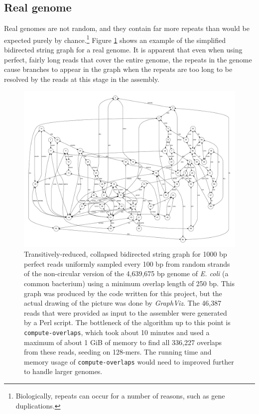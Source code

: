 \documentclass[10pt]{article}
\newcommand{\Figure}[1]{Figure \ref{#1}}
\newcommand{\ProgramName}[1]{{\tt #1}}
\begin{document}
\subsection{Real genome}

Real genomes are not random, and they contain far more repeats than would be
expected purely by chance.\footnote{Biologically, repeats can occur for a number
of reasons, such as gene duplications.} \Figure{fig:E_coli} shows an example of
the simplified bidirected string graph for a real genome.  It is apparent that
even when using perfect, fairly long reads that cover the entire genome, the
repeats in the genome cause branches to appear in the graph when the repeats are
too long to be resolved by the reads at this stage in the assembly.

\begin{figure}
	\begin{center}
		\includegraphics[width=1.0\textwidth]{E_coli.pdf}
		\caption{Transitively-reduced, collapsed bidirected string graph for
		1000 bp perfect reads uniformly sampled every 100 bp from random strands
		of the non-circular version of the 4,639,675 bp genome of {\it E. coli}
		(a common bacterium) using a minimum overlap length of 250 bp.  This
		graph was produced by the code written for this project, but the actual
		drawing of the picture was done by {\it
		GraphViz}\cite{GraphVizPublication}.  The 46,387 reads
		that were provided as input to the assembler were generated by a Perl
		script.  The bottleneck of the algorithm up to this point is
		\ProgramName{compute-overlaps}, which took about 10 minutes and used a
		maximum of about 1 GiB of memory to find all 336,227 overlaps from these
		reads, seeding on 128-mers.  The running time and memory usage of
		\ProgramName{compute-overlaps} would need to improved further to handle
		larger genomes.}
		\label{fig:E_coli}
	\end{center}
\end{figure}
\end{document}
